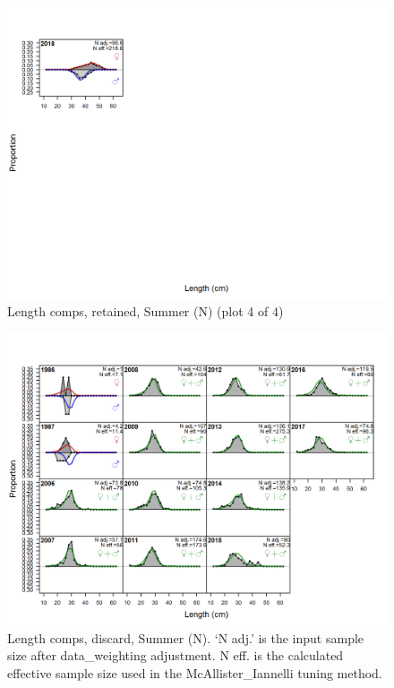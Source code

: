 \documentclass[12pt,]{article}
\begin{document}
\begin{figure}
\centering
\includegraphics{r4ss/plots_mod1/comp_lenfit_flt2mkt2_page4.png}
\caption{Length comps, retained, Summer (N) (plot 4 of 4)
\label{fig:length_fits}}
\end{figure}

\begin{figure}
\centering
\includegraphics{r4ss/plots_mod1/comp_lenfit_flt2mkt1.png}
\caption{Length comps, discard, Summer (N). `N adj.' is the input sample
size after data\_weighting adjustment. N eff. is the calculated
effective sample size used in the McAllister\_Iannelli tuning method.
\label{fig:length_fits}}
\end{figure}
\end{document}
